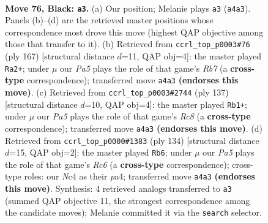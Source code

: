 \documentclass[11pt]{article}
\begin{document}
\clearpage

\begin{figure}[p]\centering
\begin{subfigure}{0.46\textwidth}\centering
\resizebox{\linewidth}{!}{%
\newchessgame
\chessboard[
  setfen={8/7R/6pP/3k1p2/p1n2P2/7K/8/8 b - - 2 76},
  showmover=false,
  pgfstyle=straightmove, color=movearrow, markmove={a4-a3}
]}
\caption{}
\end{subfigure}\hfill
\begin{subfigure}{0.46\textwidth}\centering
\resizebox{\linewidth}{!}{%
\newchessgame
\chessboard[
  setfen={R7/P4kp1/7p/K6P/8/8/1r6/8 b - - 10 84},
  showmover=false,
  pgfstyle=straightmove, color=movearrow, markmove={b2-a2}
]}
\caption{}
\end{subfigure}
\\[4pt]
\begin{subfigure}{0.46\textwidth}\centering
\resizebox{\linewidth}{!}{%
\newchessgame
\chessboard[
  setfen={1R6/1P4k1/5p2/6p1/6P1/1K6/8/2r5 b - - 12 69},
  showmover=false,
  pgfstyle=straightmove, color=movearrow, markmove={c1-b1}
]}
\caption{}
\end{subfigure}\hfill
\begin{subfigure}{0.46\textwidth}\centering
\resizebox{\linewidth}{!}{%
\newchessgame
\chessboard[
  setfen={8/6k1/2R5/6Pp/p4p1r/P7/1P3K2/8 w - - 0 68},
  showmover=false,
  pgfstyle=straightmove, color=movearrow, markmove={c6-b6}
]}
\caption{}
\end{subfigure}
\caption{\textbf{Move 76, Black: \texttt{a3}.} (a) Our position; Melanie plays \texttt{a3} (\texttt{a4a3}). Panels (b)--(d) are the retrieved master positions whose correspondence most drove this move (highest QAP objective among those that transfer to it). (b) Retrieved from \texttt{ccrl\_top\_p0003\#76} (ply 167) [structural distance $d$=11, QAP obj=4]: the master played \texttt{Ra2+}; under $\mu$ our \emph{Pa5} plays the role of that game's \emph{Rb7} (a \textbf{cross-type} correspondence); transferred move \texttt{a4a3} \textbf{(endorses this move)}. (c) Retrieved from \texttt{ccrl\_top\_p0003\#2744} (ply 137) [structural distance $d$=10, QAP obj=4]: the master played \texttt{Rb1+}; under $\mu$ our \emph{Pa5} plays the role of that game's \emph{Rc8} (a \textbf{cross-type} correspondence); transferred move \texttt{a4a3} \textbf{(endorses this move)}. (d) Retrieved from \texttt{ccrl\_top\_p0000\#1383} (ply 134) [structural distance $d$=15, QAP obj=2]: the master played \texttt{Rb6}; under $\mu$ our \emph{Pa5} plays the role of that game's \emph{Rc6} (a \textbf{cross-type} correspondence); cross-type roles: our \emph{N}c4 as their \emph{p}a4; transferred move \texttt{a4a3} \textbf{(endorses this move)}. Synthesis: 4 retrieved analogs transferred to \texttt{a3} (summed QAP objective 11, the strongest correspondence among the candidate moves); Melanie committed it via the \texttt{search} selector.}
\label{fig:thought-m151}
\end{figure}
\end{document}
